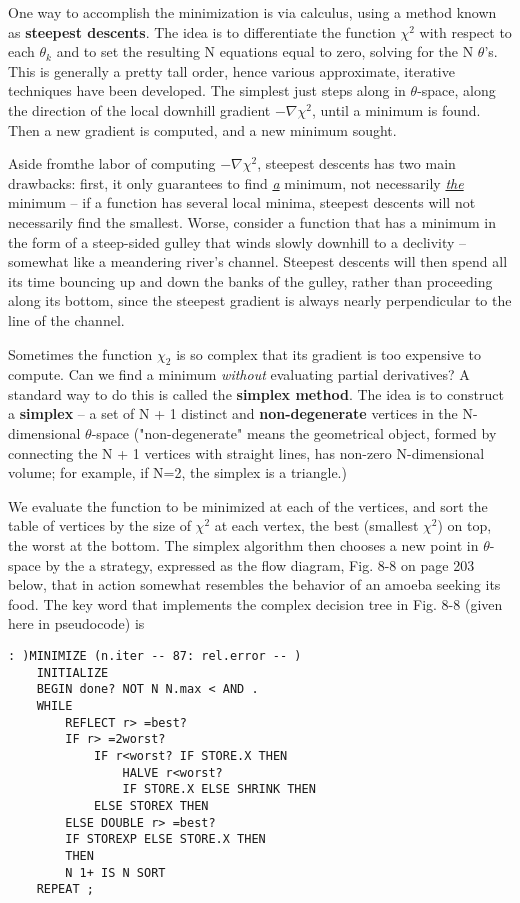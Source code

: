 One way to accomplish the minimization is via calculus, using a method known as \textbf{steepest descents}. The idea is to differentiate the function $\chi^{2}$ with respect to each $\theta_{k}$ and to set the resulting N equations equal to zero, solving for the N $\theta$'s. This is generally a pretty tall order, hence various approximate, iterative techniques have been developed. The simplest just steps along in $\theta$-space, along the direction of the local downhill gradient $-\nabla\chi^{2}$, until a minimum is found. Then a new gradient is computed, and a new minimum sought.

Aside fromthe labor of computing $-\nabla\chi^{2}$, steepest descents has two main drawbacks: first, it only guarantees to find \underline{\textit{a}} minimum, not necessarily \underline{\textit{the}} minimum -- if a function has several local minima, steepest descents will not necessarily find the smallest. Worse, consider a function that has a minimum in the form of a steep-sided gulley that winds slowly downhill to a declivity -- somewhat like a meandering river's channel. Steepest descents will then spend all its time bouncing up and down the banks of the gulley, rather than proceeding along its bottom, since the steepest gradient is always nearly perpendicular to the line of the channel.

Sometimes the function $\chi_{2}$ is so complex that its gradient is too expensive to compute. Can we find a minimum \textit{without} evaluating partial derivatives? A standard way to do this is called the \textbf{simplex method}. The idea is to construct a \textbf{simplex} -- a set of N + 1 distinct and \textbf{non-degenerate} vertices in the N-dimensional $\theta$-space ("non-degenerate" means the geometrical object, formed by connecting the N + 1 vertices with straight lines, has non-zero N-dimensional volume; for example, if N=2, the simplex is a triangle.)

We evaluate the function to be minimized at each of the vertices, and sort the table of vertices by the size of $\chi^{2}$ at each vertex, the best (smallest $\chi^{2}$) on top, the worst at the bottom. The simplex algorithm then chooses a new point in $\theta$-space by the a strategy, expressed as the ﬂow diagram, Fig. 8-8 on page 203 below, that in action somewhat resembles the behavior of an amoeba seeking its food. The key word  that implements the complex decision tree in Fig. 8-8 (given here in pseudocode) is

\begin{lstlisting}
: )MINIMIZE (n.iter -- 87: rel.error -- )
    INITIALIZE
    BEGIN done? NOT N N.max < AND .
    WHILE
        REFLECT r> =best?
        IF r> =2worst?
            IF r<worst? IF STORE.X THEN
                HALVE r<worst?
                IF STORE.X ELSE SHRINK THEN
            ELSE STOREX THEN
        ELSE DOUBLE r> =best?
        IF STOREXP ELSE STORE.X THEN
        THEN
        N 1+ IS N SORT
    REPEAT ;
\end{lstlisting}

